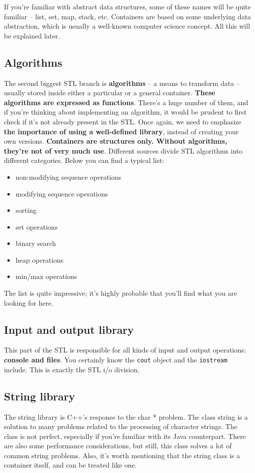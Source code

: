 If you’re familiar with abstract data structures, some of these names will be quite familiar – 
list, set, map, stack, etc. Containers are based on some underlying data abstraction, which 
is usually a well-known computer science concept. All this will be explained later.

\subsection{Algorithms} %

The second biggest STL branch is \textbf{algorithms} – a means to transform data – 
usually stored inside either a particular or a general container. \textbf{These algorithms 
are expressed as functions}. There’s a huge number of them, and if you’re thinking about 
implementing an algorithm, it would be prudent to first check if it’s not already present 
in the STL. Once again, we need to emphasize \textbf{the importance of using a well-defined library}, 
instead of creating your own versions. \textbf{Containers are structures only. Without algorithms, 
they’re not of very much use}. Different sources divide STL algorithms into different categories. 
Below you can find a typical list:
\begin{itemize}
    \item non-modifying sequence operations
    \item modifying sequence operations
    \item sorting
    \item set operations
    \item binary search
    \item heap operations
    \item min/max operations
\end{itemize}
The list is quite impressive; it’s highly probable that you’ll find what you are looking for here.

\subsection{Input and output library} %
This part of the STL is responsible for all kinds of input and output operations: 
\textbf{console and files}. You certainly know the \texttt{cout} object and the 
\texttt{iostream} include. This is exactly the STL i/o division.

\subsection{String library} %
The string library is C++'s response to the char * problem. The class string is a solution 
to many problems related to the processing of character strings. The class is not perfect, 
especially if you’re familiar with its Java counterpart. There are also some performance 
considerations, but still, this class solves a lot of common string problems. Also, it’s worth 
mentioning that the string class is a container itself, and can be treated like one.

